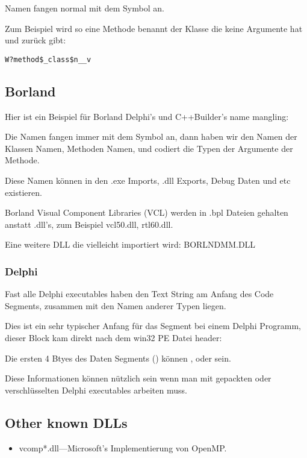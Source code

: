 Namen fangen normal mit dem  Symbol an. 

Zum Beispiel wird so eine Methode benannt  der Klasse  die keine Argumente hat und \Tvoid zur\"uck gibt: %

\begin{lstlisting}
W?method$_class$n__v
\end{lstlisting}

\subsection{Borland}

Hier ist ein Beispiel f\"ur Borland Delphi's und C++Builder's \gls{name mangling}:



Die Namen fangen immer mit dem  Symbol an, dann haben wir den Namen
der Klassen Namen, Methoden Namen, und codiert die Typen der Argumente der Methode.

Diese Namen k\"onnen in den .exe Imports, .dll Exports, Debug Daten und etc existieren.

Borland Visual Component Libraries (VCL) 
werden in .bpl Dateien gehalten anstatt .dll's, zum Beispiel vcl50.dll, rtl60.dll.

Eine weitere DLL die vielleicht importiert wird: BORLNDMM.DLL

\subsubsection{Delphi}

Fast alle Delphi executables haben den  Text String am Anfang des Code Segments, zusammen mit den Namen anderer Typen liegen.

Dies ist ein sehr typischer Anfang f\"ur das  Segment bei einem 
Delphi Programm, dieser Block kam direkt nach dem win32 PE Datei header:



Die ersten 4 Btyes des Daten Segments () k\"onnen ,  oder  sein.

Diese Informationen k\"onnen n\"utzlich sein wenn man mit gepackten oder verschl\"usselten Delphi executables arbeiten muss. 

\subsection{Other known DLLs}

\begin{itemize}
\item vcomp*.dll---Microsoft's Implementierung von OpenMP. 
\end{itemize}

